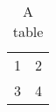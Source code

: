 \begin{table}[!h]
    \centering
    \begin{tabular}{c|c}
        1 & 2 \\
        3 & 4
    \end{tabular}
    \caption{A table}
    \label{table:introduction}
\end{table}